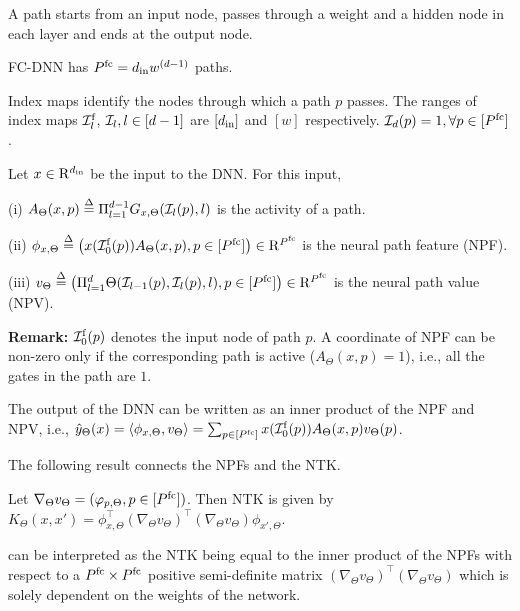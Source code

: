 \begin{definition}
A path starts from an input node, passes through a weight and a hidden node in each layer and ends at the output node.
\end{definition}
\begin{proposition}
FC-DNN has $P^{\text{fc}}=d_{\text{in}} w^{(d-1)}$ paths.
\end{proposition}
\begin{notation}
Index maps identify the nodes through which a path $p$ passes. The ranges of index maps $\mathcal{I}^{\text{f}}_l$, $\mathcal{I}_l,l\in[d-1]$ are $[d_{\text{in}}]$ and $[w]$ respectively.  $\mathcal{I}_d(p)=1,\forall p\in[P^{\text{fc}}]$.
\end{notation}

\begin{definition}\label{def:nps} Let $x\in\mathrm{R}^{d_{\text{in}}}$ be the input to the DNN. For this input, 

(i)  $A_{\Theta}(x,p)\stackrel{\Delta}{=}\Pi_{l=1}^{d-1} G_{x,\Theta}(\mathcal{I}_l(p),l)$ is the activity of a path.

(ii)  $\phi_{x,\Theta}\stackrel{\Delta}{=} \left( x(\mathcal{I}^{\text{f}}_0(p))A_{\Theta}(x,p), p\in[P^{\text{fc}}]\right)\in\mathrm{R}^{P^{\text{fc}}}$ is the {neural path feature} (NPF).

(iii)  $v_{\Theta}\stackrel{\Delta}{=} \left( \Pi_{l=1}^d \Theta(\mathcal{I}_{l-1}(p),\mathcal{I}_l(p),l), p\in[P^{\text{fc}}]\right)\in\mathrm{R}^{P^{\text{fc}}}$ is the {neural path value} (NPV).
\end{definition}
\textbf{Remark:} $\mathcal{I}^{\text{f}}_0(p)$ denotes the input node of path $p$. A coordinate of NPF can be non-zero only if the corresponding path is active ($A_{\Theta}(x,p)=1$), i.e., all the gates in the path are $1$. 
\begin{proposition}\label{prop:zero}  The output of the DNN can be written as an inner product of the NPF and NPV, i.e., 
$\hat{y}_{\Theta}(x)=\langle \phi_{x,\Theta},v_{\Theta}\rangle=\sum_{p\in [P^{\text{fc}}]}x(\mathcal{I}^{\text{f}}_0(p))A_{\Theta}(x,p)v_{\Theta}(p)$.
\end{proposition}
The following result connects the NPFs and the NTK.
\begin{proposition}\label{prop:ntknew}
Let $\nabla_{\Theta}v_{\Theta}=(\varphi_{p,\Theta},p\in[P^{\text{fc}}])$. Then NTK is given by $K_{\Theta}(x,x')=\phi^\top_{x,\Theta}(\nabla_{\Theta}v_{\Theta})^\top(\nabla_{\Theta}v_{\Theta})\phi_{x',\Theta}$.
\end{proposition}
 can be interpreted as the NTK being equal to the inner product of the NPFs with respect to a $P^{\text{fc}}\times P^{\text{fc}}$ positive semi-definite matrix $(\nabla_{\Theta}v_{\Theta})^\top(\nabla_{\Theta}v_{\Theta})$ which is solely dependent on the weights of the network.

